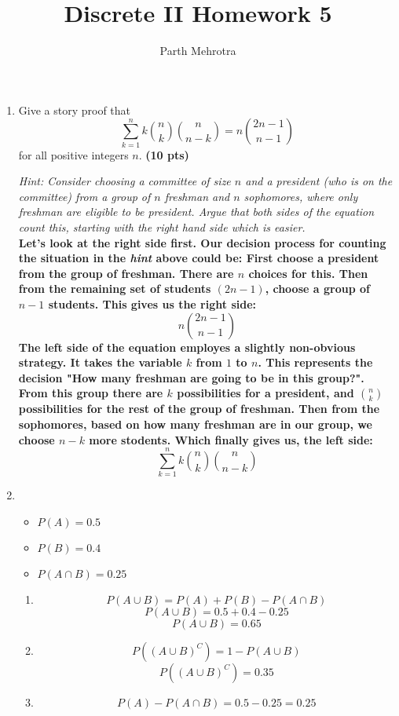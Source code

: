\documentclass{article}
\begin{document}
	\title{Discrete II Homework 5}
	\author{Parth Mehrotra}
	\maketitle

	\begin{enumerate}

		\item 
			Give a story proof that
			\[
			\sum_{k=1}^n k \binom{n}{k}\binom{n}{n-k} = n \binom{2n -1}{n-1}
			\]
			for all positive integers $n$. \textbf{(10 pts)}

			\emph{Hint:  Consider choosing a committee of size $n$ and a president (who is on the committee) from a
			group of $n$ freshman and $n$ sophomores, where only freshman are eligible to
			be president.  Argue that both sides of the equation count this, starting
			with the right hand side which is easier.}\\

			\textbf{
				Let's look at the right side first. Our decision process for counting the situation in the \emph{hint} above could be: First choose a president from the group of freshman. There are \(n\) choices for this. Then from the remaining set of students \((2n -1)\), choose a group of \(n-1\) students. This gives us the right side: 
				\[ n \binom{2n-1}{n-1} \]
				The left side of the equation employes a slightly non-obvious strategy. It takes the variable \(k\) from \(1\) to \(n\). This represents the decision "How many freshman are going to be in this group?". From this group there are \(k\) possibilities for a president, and \(\binom{n}{k}\) possibilities for the rest of the group of freshman. Then from the sophomores, based on how many freshman are in our group, we choose \(n-k\) more stodents. Which finally gives us, the left side:
				\[
					\sum_{k=1}^n k \binom{n}{k}\binom{n}{n-k}
				\]
			}

		\item
			\begin{itemize}
				\item \(P(A) = 0.5\)
				\item \(P(B) = 0.4\)
				\item \(P(A \cap B) = 0.25\)
			\end{itemize}
			\begin{enumerate}
				\item 
					\[P(A \cup B) = P(A) + P(B) - P(A \cap B) \]
					\[P(A \cup B) = 0.5 + 0.4 - 0.25 \]
					\[P(A \cup B) = 0.65\]
				\item
					\[P((A \cup B)^C) = 1-P(A \cup B) \]
					\[P((A \cup B)^C) = 0.35\]
				\item
					\[P(A) - P(A \cap B) = 0.5 - 0.25 = 0.25 \]
			\end{enumerate}


\end{enumerate}
\end{document}
